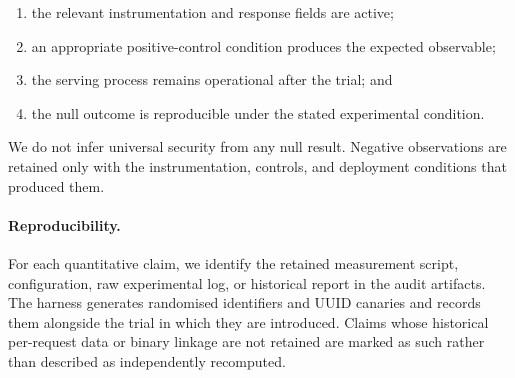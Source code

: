 \begin{enumerate}
    \item the relevant instrumentation and response fields are active;
    \item an appropriate positive-control condition produces the expected
    observable;
    \item the serving process remains operational after the trial; and
    \item the null outcome is reproducible under the stated experimental
    condition.
\end{enumerate}

We do not infer universal security from any null result. Negative
observations are retained only with the instrumentation, controls, and
deployment conditions that produced them.

\paragraph{Reproducibility.}
For each quantitative claim, we identify the retained measurement script,
configuration, raw experimental log, or historical report in the audit
artifacts. The harness generates randomised identifiers and UUID canaries
and records them alongside the trial in which they are introduced. Claims
whose historical per-request data or binary linkage are not retained are
marked as such rather than described as independently recomputed.
	
	
